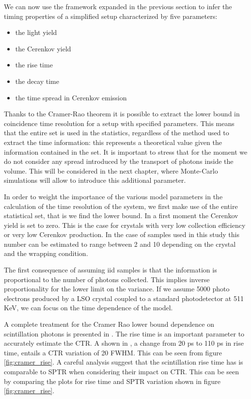 We can now use the framework expanded in the previous section to infer the timing properties of a simplified setup characterized by five parameters:
\begin{itemize}
\item the light yield
\item the Cerenkov yield
\item the rise time
\item the decay time
\item the time spread in Cerenkov emission 
\end{itemize}
Thanks to the Cramer-Rao theorem it is possible to extract the lower bound in coincidence time resolution for a setup with specified parameters. This means that the entire set is used in the statistics, regardless of the method used to extract the time information: this represents a theoretical value given the information contained in the set.
It is important to stress that for the moment we do not consider any spread introduced by the transport of photons inside the volume. This will be considered in the next chapter, where Monte-Carlo simulations will allow to introduce this additional parameter.

In order to weight the importance of the various model parameters in the calculation of the time resolution of the system, we first make use of the entire statistical set, that is we find the lower bound.
In a first moment the Cerenkov yield is set to zero.
This is the case for crystals with very low collection efficiency or very low Cerenkov production. In the case of samples used in this study this number can be estimated to range between 2 and 10 depending on the crystal and the wrapping condition. 

The first consequence of assuming iid samples is that the information is proportional to the number of photons collected.
This implies inverse proportionality for the lower limit on the variance. If we assume 5000 photo electrons produced by a LSO crystal coupled to a standard photodetector at 511 KeV, we can focus on the time dependence of the model.

A complete treatment for the Cramer Rao lower bound dependence on scintillation photons is presented in \cite{Gundacker2014}. The rise time is an important parameter to accurately estimate the CTR. A shown in \cite{Gundi}, a change from 20 ps to 110 ps in rise time, entails a CTR variation of 20 FWHM. This can be seen from figure \ref{fig:cramer_rise}. A careful analysis suggest that the scintillation rise time has is comparable to SPTR when considering their impact on CTR. This can be seen by comparing the plots for rise time and SPTR variation shown in figure \ref{fig:cramer_rise}.


